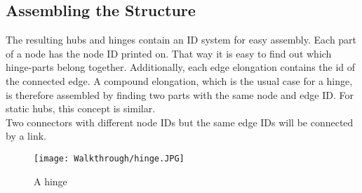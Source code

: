\subsection{Assembling the Structure}
The resulting hubs and hinges contain an ID system for easy assembly. Each part of a node has the node ID printed on. That way it is easy to find out which hinge-parts belong together. Additionally, each edge elongation contains the id of the connected edge. A compound elongation, which is the usual case for a hinge, is therefore assembled by finding two parts with the same node and edge ID. For static hubs, this concept is similar.\\
Two connectors with different node IDs but the same edge IDs will be connected by a link.
\begin{figure}[h!]
    \texttt{[image: Walkthrough/hinge.JPG]}
    \centering
    \caption{A hinge}
    \label{fig:hinge}
\end{figure}
